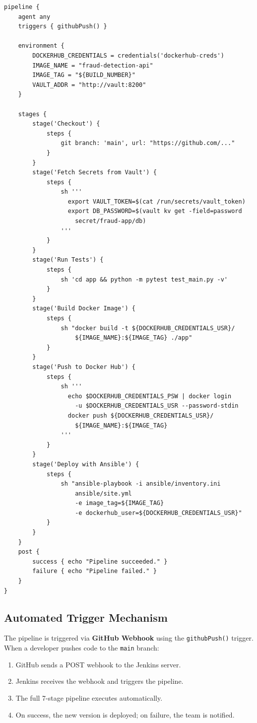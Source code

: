 \documentclass[12pt,a4paper]{article}
\begin{document}
\begin{lstlisting}[language={},caption={Jenkinsfile (Abbreviated)}]
pipeline {
    agent any
    triggers { githubPush() }

    environment {
        DOCKERHUB_CREDENTIALS = credentials('dockerhub-creds')
        IMAGE_NAME = "fraud-detection-api"
        IMAGE_TAG = "${BUILD_NUMBER}"
        VAULT_ADDR = "http://vault:8200"
    }

    stages {
        stage('Checkout') {
            steps {
                git branch: 'main', url: "https://github.com/..."
            }
        }
        stage('Fetch Secrets from Vault') {
            steps {
                sh '''
                  export VAULT_TOKEN=$(cat /run/secrets/vault_token)
                  export DB_PASSWORD=$(vault kv get -field=password
                    secret/fraud-app/db)
                '''
            }
        }
        stage('Run Tests') {
            steps {
                sh 'cd app && python -m pytest test_main.py -v'
            }
        }
        stage('Build Docker Image') {
            steps {
                sh "docker build -t ${DOCKERHUB_CREDENTIALS_USR}/
                    ${IMAGE_NAME}:${IMAGE_TAG} ./app"
            }
        }
        stage('Push to Docker Hub') {
            steps {
                sh '''
                  echo $DOCKERHUB_CREDENTIALS_PSW | docker login
                    -u $DOCKERHUB_CREDENTIALS_USR --password-stdin
                  docker push ${DOCKERHUB_CREDENTIALS_USR}/
                    ${IMAGE_NAME}:${IMAGE_TAG}
                '''
            }
        }
        stage('Deploy with Ansible') {
            steps {
                sh "ansible-playbook -i ansible/inventory.ini
                    ansible/site.yml
                    -e image_tag=${IMAGE_TAG}
                    -e dockerhub_user=${DOCKERHUB_CREDENTIALS_USR}"
            }
        }
    }
    post {
        success { echo "Pipeline succeeded." }
        failure { echo "Pipeline failed." }
    }
}
\end{lstlisting}

\subsection{Automated Trigger Mechanism}

The pipeline is triggered via \textbf{GitHub Webhook} using the \texttt{githubPush()} trigger. When a developer pushes code to the \texttt{main} branch:

\begin{enumerate}
    \item GitHub sends a POST webhook to the Jenkins server.
    \item Jenkins receives the webhook and triggers the pipeline.
    \item The full 7-stage pipeline executes automatically.
    \item On success, the new version is deployed; on failure, the team is notified.
\end{enumerate}
\end{document}

